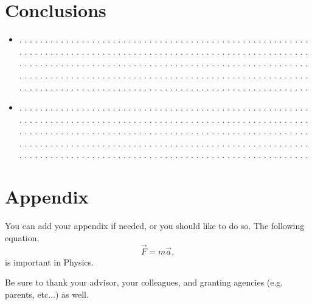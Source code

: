 \documentclass[twocolumn]{revtex4}
\begin{document}
\section{Conclusions}
\begin{itemize}

\item
. . . . . . . . . . . . . . . . . . . . . . . . . . . . . . . . . . . . . . . .
. . . . . . . . . . . . . . . . . . . . . . . . . . . . . . . . . . . . . . . .
. . . . . . . . . . . . . . . . . . . . . . . . . . . . . . . . . . . . . . . .
. . . . . . . . . . . . . . . . . . . . . . . . . . . . . . . . . . . . . . . .
. . . . . . . . . . . . . . . . . . . . . . . . . . . . . . . . . . . . . . . .
. . . . . . . . . . . . . . . . . . . . . . . . . . . . . . . . . . . . . . . .
. . . . . . . . . . . . . . . . . . . . . . . . . . . . . . . . . . . . . . . .

\item
. . . . . . . . . . . . . . . . . . . . . . . . . . . . . . . . . . . . . . . .
. . . . . . . . . . . . . . . . . . . . . . . . . . . . . . . . . . . . . . . .
. . . . . . . . . . . . . . . . . . . . . . . . . . . . . . . . . . . . . . . .
. . . . . . . . . . . . . . . . . . . . . . . . . . . . . . . . . . . . . . . .
. . . . . . . . . . . . . . . . . . . . . . . . . . . . . . . . . . . . . . . .
. . . . . . . . . . . . . . . . . . . . . . . . . . . . . . . . . . . . . . . .
. . . . . . . . . . . . . . . . . . . . . . . . . . . . . . . . . . . . . . . .
\end{itemize}


\section{Appendix}
You can add your appendix if needed, or you should like
to do so. The following equation,
\begin{equation}
\vec{F}= m \vec{a},
\label{newton}
\end{equation}
is important in Physics.

\vspace*{0.5cm}
\begin{acknowledgments}
Be sure to thank your advisor, 
your colleagues, and granting agencies (e.g. parents, etc...) as well.
\end{acknowledgments}
\end{document}
